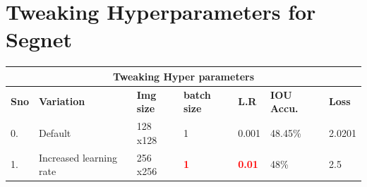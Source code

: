\documentclass{IEEEtran}
\begin{document}
\section{\textbf{Tweaking Hyperparameters for Segnet}}

\begin{tabular}{ |p{0.6cm}|p{1.2cm}|p{0.6cm}|p{0.6cm}|p{0.6cm}|p{0.8cm}|p{0.8cm}|}
 \hline
 \multicolumn{7}{|c|}{\textbf{Tweaking Hyper parameters}} \\
 \hline
 \textbf{Sno} & \textbf{Variation} & \textbf{Img size} & \textbf{batch size} & \textbf{L.R} & \textbf{IOU Accu.} & \textbf{Loss} \\
 \hline
 0. & Default   & 128 x128    & 1  & 0.001 & 48.45\% & 2.0201 \\
 \hline
 1. & Increased learning rate   & 256 x256    & \textcolor{red}{\textbf{1}}  & \textcolor{red}{\textbf{0.01}} & 48\% & 2.5 \\
 \hline
\end{tabular}
\end{document}

